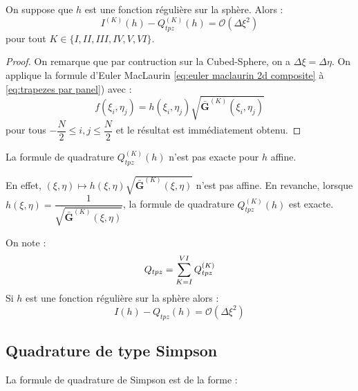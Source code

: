 \begin{proposition}
On suppose que $h$ est une fonction régulière sur la sphère. Alors :
\begin{equation}
I^{(K)}(h) - Q_{tpz}^{(K)}(h) = \mathcal{O} \left( \Delta \xi^2 \right)
\end{equation}
pour tout $K \in \lbrace I, II, III, IV, V, VI \rbrace$.
\label{prop:consistance tpz panel}
\end{proposition}

\begin{proof}
On remarque que par contruction sur la Cubed-Sphere, on a $\Delta \xi = \Delta \eta$.
On applique la formule d'Euler MacLaurin \eqref{eq:euler maclaurin 2d composite} à \eqref{eq:trapezes par panel}) avec :
\begin{equation}
f(\xi_i,\eta_j) = h(\xi_i, \eta_j) \sqrt{\mathbf{\bar{G}}^{(K)}(\xi_i, \eta_j)} 
\end{equation}
pour tous $-\dfrac{N}{2} \leq i,j \leq \dfrac{N}{2}$ et le résultat est immédiatement obtenu.
\end{proof}

\begin{remarque}
La formule de quadrature $Q_{tpz}^{(K)}(h)$ n'est pas exacte pour $h$ affine.

En effet, $(\xi,\eta) \mapsto h(\xi, \eta) \sqrt{\mathbf{\bar{G}}^{(K)}(\xi, \eta)}$ n'est pas affine.
En revanche, lorsque $h(\xi,\eta)=\dfrac{1}{\sqrt{\mathbf{\bar{G}}^{(K)}(\xi, \eta)}}$, la formule de quadrature $Q_{tpz}^{(K)}(h)$ est exacte.
\end{remarque}

\begin{proposition}
On note :
\begin{equation}
Q_{tpz}=\displaystyle\sum\limits_{K=I}^{VI} Q_{tpz}^{(K)}
\end{equation}
Si $h$ est une fonction régulière sur la sphère alors :
\begin{equation}
I(h) - Q_{tpz}(h) = \mathcal{O} \left( \Delta \xi^2 \right)
\end{equation}
\label{prop:consistance tpz}
\end{proposition}



\subsection{Quadrature de type Simpson}

La formule de quadrature de Simpson est de la forme :

